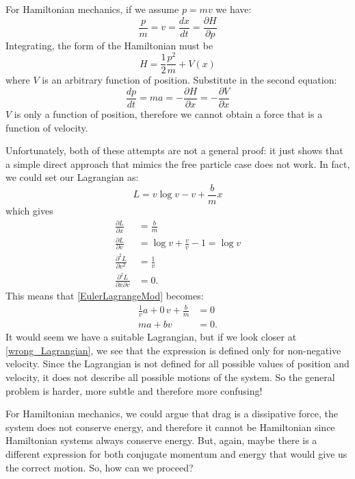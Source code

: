 \documentclass[11pt]{article}
\begin{document}
For Hamiltonian mechanics, if we assume $p=mv$ we have:
\begin{equation*}
	\frac{p}{m}=v= \frac{dx}{dt} = \frac{\partial H}{\partial p}
\end{equation*}
Integrating, the form of the Hamiltonian must be
\begin{equation*}
	H=\frac{1}{2}\frac{p^2}{m} + V(x)
\end{equation*}
where $V$ is an arbitrary function of position. Substitute in the second equation:
\begin{equation*}
	\frac{dp}{dt}= ma = - \frac{\partial H}{\partial x} = - \frac{\partial V}{\partial x}
\end{equation*}
$V$ is only a function of position, therefore we cannot obtain a force that is a function of velocity.

Unfortunately, both of these attempts are not a general proof: it just shows that a simple direct approach that mimics the free particle case does not work. In fact, we could set our Lagrangian as:
\begin{equation}\label{wrong_Lagrangian}
	L=v \log v - v + \frac{b}{m} x
\end{equation}
which gives
\begin{align*}
	\frac{\partial L}{\partial x} &= \frac{b}{m}\\
	\frac{\partial L}{\partial v} &= \log v + \frac{v}{v} - 1=\log v\\
	\frac{\partial^2 L}{\partial v^2} &= \frac{1}{v}\\
	\frac{\partial^2 L}{\partial x \partial v} &= 0.
\end{align*}
This means that \eqref{EulerLagrangeMod} becomes:
\begin{align*}
	\frac{1}{v} a + 0 \, v + \frac{b}{m} &= 0 \\
	ma + bv &= 0.
\end{align*}
It would seem we have a suitable Lagrangian, but if we look closer at \eqref{wrong_Lagrangian}, we see that the expression is defined only for non-negative velocity. Since the Lagrangian is not defined for all possible values of position and velocity, it does not describe all possible motions of the system. So the general problem is harder, more subtle and therefore more confusing!

For Hamiltonian mechanics, we could argue that drag is a dissipative force, the system does not conserve energy, and therefore it cannot be Hamiltonian since Hamiltonian systems always conserve energy. But, again, maybe there is a different expression for both conjugate momentum and energy that would give us the correct motion. So, how can we proceed?
\end{document}
